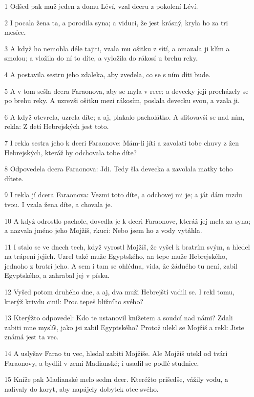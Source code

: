\par 1 Odšed pak muž jeden z domu Léví, vzal dceru z pokolení Léví.
\par 2 I pocala žena ta, a porodila syna; a viduci, že jest krásný, kryla ho za tri mesíce.
\par 3 A když ho nemohla déle tajiti, vzala mu ošitku z sítí, a omazala ji klím a smolou; a vložila do ní to díte, a vyložila do rákosí u brehu reky.
\par 4 A postavila sestru jeho zdaleka, aby zvedela, co se s ním díti bude.
\par 5 A v tom sešla dcera Faraonova, aby se myla v rece; a devecky její procházely se po brehu reky. A uzrevši ošitku mezi rákosím, poslala devecku svou, a vzala ji.
\par 6 A když otevrela, uzrela díte; a aj, plakalo pacholátko. A slitovavši se nad ním, rekla: Z detí Hebrejských jest toto.
\par 7 I rekla sestra jeho k dceri Faraonove: Mám-li jíti a zavolati tobe chuvy z žen Hebrejských, kteráž by odchovala tobe díte?
\par 8 Odpovedela dcera Faraonova: Jdi. Tedy šla devecka a zavolala matky toho dítete.
\par 9 I rekla jí dcera Faraonova: Vezmi toto díte, a odchovej mi je; a ját dám mzdu tvou. I vzala žena díte, a chovala je.
\par 10 A když odrostlo pachole, dovedla je k dceri Faraonove, kteráž jej mela za syna; a nazvala jméno jeho Mojžíš, rkuci: Nebo jsem ho z vody vytáhla.
\par 11 I stalo se ve dnech tech, když vyrostl Mojžíš, že vyšel k bratrím svým, a hledel na trápení jejich. Uzrel také muže Egyptského, an tepe muže Hebrejského, jednoho z bratrí jeho. A sem i tam se ohlédna, vida, že žádného tu není, zabil Egyptského, a zahrabal jej v písku.
\par 12 Vyšed potom druhého dne, a aj, dva muži Hebrejští vadili se. I rekl tomu, kterýž krivdu cinil: Proc tepeš bližního svého?
\par 13 Kterýžto odpovedel: Kdo te ustanovil knížetem a soudcí nad námi? Zdali zabiti mne myslíš, jako jsi zabil Egyptského? Protož ulekl se Mojžíš a rekl: Jiste známá jest ta vec.
\par 14 A uslyšav Farao tu vec, hledal zabiti Mojžíše. Ale Mojžíš utekl od tvári Faraonovy, a bydlil v zemi Madianské; i usadil se podlé studnice.
\par 15 Kníže pak Madianské melo sedm dcer. Kteréžto prišedše, vážily vodu, a nalívaly do koryt, aby napájely dobytek otce svého.
